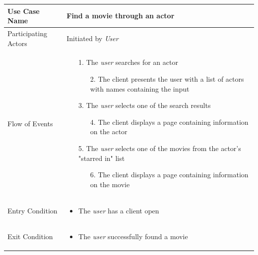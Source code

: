 \begin{center}
	\begin{tabular}{ | l | p{10cm} |  }
		 \hline
		Use Case Name & Find a movie through an actor \\ \hline
		Participating Actors & Initiated by \emph{User} \\ \hline
		Flow of Events & \begin{enumerate}
						\item[1.] The \emph{user} searches for an actor
						\begin{enumerate}
							\item[2.] The client presents the user with a list of actors with names containing the input
						\end{enumerate}
						\item[3.] The \emph{user} selects one of the search results
						\begin{enumerate}
							\item[4.] The client displays a page containing information on the actor
						\end{enumerate}
						\item[5.] The \emph{user} selects one of the movies from the actor's "starred in" list
						\begin{enumerate}
							\item[6.] The client displays a page containing information on the movie
						\end{enumerate}
					\end{enumerate} \\ \hline
		Entry Condition & \begin{itemize}
						\item The \emph{user} has a client open
					\end{itemize} \\ \hline
		Exit Condition & \begin{itemize}
						\item The \emph{user} successfully found a movie
					\end{itemize} \\
		\hline
	\end{tabular}
\end{center}


